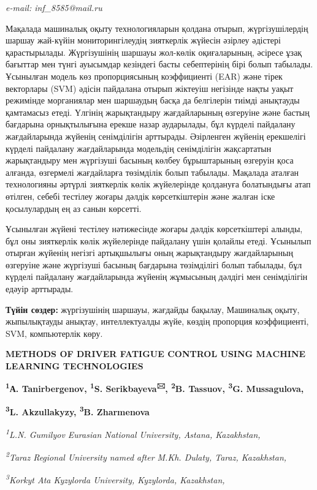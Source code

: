 \documentclass[
]{article}
\begin{document}
\emph{e-mail: inf\_8585@mail.ru}

Мақалада машиналық оқыту технологияларын қолдана отырып, жүргізушілердің
шаршау жай-күйін мониторингілеудің зияткерлік жүйесін әзірлеу әдістері
қарастырылады. Жүргізушінің шаршауы жол-көлік оқиғаларының, әсіресе ұзақ
бағыттар мен түнгі ауысымдар кезіндегі басты себептерінің бірі болып
табылады. Ұсынылған модель көз пропорциясының коэффициенті (EAR) және
тірек векторлары (SVM) әдісін пайдалана отырып жіктеуіш негізінде нақты
уақыт режимінде морганиялар мен шаршаудың басқа да белгілерін тиімді
анықтауды қамтамасыз етеді. Үлгінің жарықтандыру жағдайларының өзгеруіне
және бастың бағдарына орнықтылығына ерекше назар аударылады, бұл күрделі
пайдалану жағдайларында жүйенің сенімділігін арттырады. Әзірленген
жүйенің ерекшелігі күрделі пайдалану жағдайларында модельдің
сенімділігін жақсартатын жарықтандыру мен жүргізуші басының көлбеу
бұрыштарының өзгеруін қоса алғанда, өзгермелі жағдайларға төзімділік
болып табылады. Мақалада аталған технологияны әртүрлі зияткерлік көлік
жүйелерінде қолдануға болатындығы атап өтілген, себебі тестілеу жоғары
дәлдік көрсеткіштерін және жалған іске қосылулардың ең аз санын
көрсетті.

Ұсынылған жүйені тестілеу нәтижесінде жоғары дәлдік көрсеткіштері
алынды, бұл оны зияткерлік көлік жүйелерінде пайдалану үшін қолайлы
етеді. Ұсынылып отырған жүйенің негізгі артықшылығы оның жарықтандыру
жағдайларының өзгеруіне және жүргізуші басының бағдарына төзімділігі
болып табылады, бұл күрделі пайдалану жағдайларында жүйенің жұмысының
дәлдігі мен сенімділігін едәуір арттырады.

\textbf{Түйін сөздер:} жүргізушінің шаршауы, жағдайды бақылау, Машиналық
оқыту, жыпылықтауды анықтау, интеллектуалды жүйе, көздің пропорция
коэффициенті, SVM, компьютерлік көру.

\textbf{METHODS OF DRIVER FATIGUE CONTROL USING MACHINE LEARNING
TECHNOLOGIES}

\textbf{\textsuperscript{1}А. Tanirbergenov, \textsuperscript{1}S.
Serikbayeva\textsuperscript{🖂}, \textsuperscript{2}B. Tassuov,
\textsuperscript{3}G. Mussagulova,}

\textbf{\textsuperscript{3}L. Akzullakyzy, \textsuperscript{3}B.
Zharmenova}

\emph{\textsuperscript{1}L.N. Gumilyov Eurasian National University,
Astana, Kazakhstan,}

\emph{\textsuperscript{2}Taraz Regional University named after M.Kh.
Dulaty, Taraz, Kazakhstan,}

\emph{\textsuperscript{3}Korkyt Ata Kyzylorda University, Kyzylorda,
Kazakhstan,}
\end{document}
